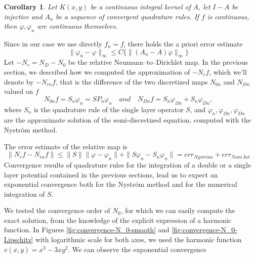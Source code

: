 \documentclass[10pt, a4paper, twoside, openright]{book}
\theoremstyle{definition}
\theoremstyle{plain}
\theoremstyle{plain}
\newtheorem{corollary}[subsection]{Corollary}
\theoremstyle{plain}
\theoremstyle{plain}
\theoremstyle{plain}
\theoremstyle{plain}
\theoremstyle{plain}
\theoremstyle{plain}
\let\phi\varphi
\begin{document}
\begin{corollary}
 Let $K(x,y)$ be a continuous integral kernel of $A$, let $I-A$ be injective and $A_n$ be a sequence of convergent quadrature rules. 
 If $f$ is continuous, then $\phi,\phi_n$ are continuous themselves. 
\end{corollary}
Since in our case we use directly $f_n=f$, there holds the a priori error estimate
 \begin{equation}
  \|\phi_n - \phi \|_{\infty} \leq C\{\|(A_n - A)\phi\|_{\infty}\}
 \end{equation}
Let $-N_r=N_D - N_0$ be the relative Neumann--to--Dirichlet map. In the previous section, we described
how we computed the approximation of $-{N_r}f$, which we'll denote by $-{N_{rn}}f$, that is the difference 
of the two discretized maps $N_{0n}$ and $N_{Dn}$ valued on $f$
\begin{equation}
 {N_{0n}}f = S_n\phi_n = SP_n\phi_n\quad and \quad{N_{Dn}}f = S_n\phi_{\Omega n} + S_n\phi_{D n},
\end{equation}
where $S_n$ is the quadrature rule of the single layer operator $S$, and 
$\phi_n, \phi_{\Omega n}, \phi_{Dn}$ 
are the approximate solution of the semi-discretized equation, computed with the Nystr\"{o}m method.
\par
The error estimate of the relative map is
\begin{equation}
 \|{N_r}f - {N_{rn}}f\|\leq\|S\|\|\phi-\phi_n\| + \|S\phi_n - S_n\phi_n\| = err_{Nystr\textit{\"{o}}m} + err_{Num\,Int}
\end{equation}
Convergence results of quadrature rules for the integration of a double or a single layer potential 
contained in the previous sections, lead us to expect an exponential convergence both for the Nystr\"{o}m method and 
for the numerical integration of $S$.
\par
We tested the convergence order of $N_0$, for which we can easily compute the exact solution, 
from the knowledge of the explicit expression of a harmonic function. In Figures 
\ref{fig:convergence-N_0-smooth} and \ref{fig:convergence-N_0-Lipschitz} with 
logarithmic scale for both axes, we used 
the harmonic function $v(x,y)=x^3 - 3 xy^2$. We can observe the exponential convergence 
\end{document}
